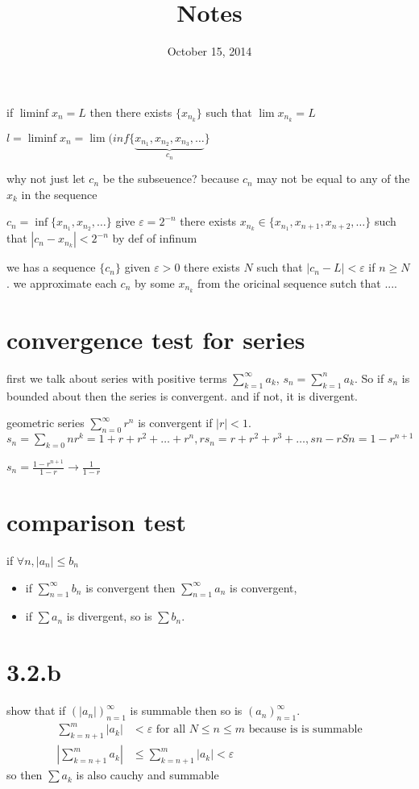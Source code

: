 \documentclass[letterpaper]{article}
\begin{document}
\title{Notes}
\date{October 15, 2014}
\maketitle
if $\liminf x_n=L$ then there exists $\{x_{n_k}\}$ such that $\lim x_{n_k}=L$

$l=\liminf x_n=\lim(inf\{\underbrace{x_{n_1},x_{n_2},x_{n_3},\dots}_{c_n}\}$

why not just let $c_n$ be the subseuence? because $c_n$ may not be equal to any of the $x_k$ in the sequence

$c_n=\inf\{x_{n_1},x_{n_2},\dots\}$ give $\varepsilon=2^{-n}$ there exists $x_{n_k}\in\{x_{n_1},x_{n+1},x_{n+2},\dots\}$ such that $\left\lvert c_n-x_{n_k}\right\rvert<2^{-n}$ by def of infinum

we has a sequence $\{c_n\}$ given $\varepsilon>0$ there exists $N$ such that $\left\lvert c_n-L\right\rvert<\varepsilon$ if $n\ge N$. we approximate each $c_n$ by some $x_{n_k}$ from the oricinal sequence sutch that ....

\section*{convergence test for series}
first we talk about series with positive terms $\sum\limits_{k=1}^\infty{a_k}$, $s_n=\sum\limits_{k=1}^n{a_k}$. So if $s_n$ is bounded about then the series is convergent. and if not, it is divergent.

geometric series $\sum\limits_{n=0}^\infty{r^n}$ is convergent if $\left\lvert r\right\rvert<1$. $s_n=\sum\limits_{k=0}n{r^k}=1+r+r^2+\dots+r^n, rs_n=r+r^2+r^3+\dots, sn-rSn=1-r^{n+1}$

$s_n=\frac{1-r^{n+1}}{1-r}\to\frac{1}{1-r}$


\section*{comparison test}
if $\forall n, |a_n|\le b_n$
\begin{itemize}
\item
  if $\sum\limits_{n=1}^\infty{b_n}$ is convergent then $\sum\limits_{n=1}^\infty{a_n}$ is convergent,
  \item
  if $\sum\limits{a_n}$ is divergent, so is $\sum\limits{b_n}$.
\end{itemize}
\section*{3.2.b}
show that if $\left(|a_n|\right)_{n=1}^\infty$ is summable then so is $\left(a_n\right)_{n=1}^\infty$.
\begin{align*}
  \sum\limits_{k=n+1}^m{|a_k|}&<\varepsilon\text{ for all }N\le n\le m \text{ because is is summable}\\
  \left\lvert\sum\limits_{k=n+1}^m{a_k}\right\rvert&\le\sum\limits_{k=n+1}^m{|a_k|}<\varepsilon
\end{align*}
so then $\sum\limits{a_k}$ is also cauchy and summable
\end{document}
